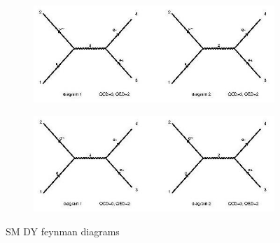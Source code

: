 \documentclass{CUP-JNL-DTM}%
\theoremstyle{definition}
\numberwithin{equation}{section}
\begin{document}
\begin{figure}[H]
  \begin{subfigure}{.5\textwidth}
    \centering
    \includegraphics[width=1\linewidth]{img/dy_sm_diagrams.jpg}
    \label{fig:sm_dy1}
  \end{subfigure}%
  \begin{subfigure}{.5\textwidth}
    \centering
    \includegraphics[width=1\linewidth]{img/dy2_sm_diagrams.jpg}
    \label{fig:sm_dy2}
  \end{subfigure}
  \caption{SM DY feynman diagrams}
  \label{fig:sm_dy}
\end{figure}
\end{document}
